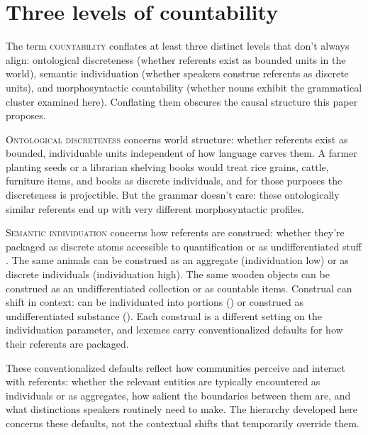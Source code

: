 \documentclass[12pt,a4paper]{article}
\begin{document}
\section{Three levels of countability}\label{sec:levels}

The term \textsc{countability} conflates at least three distinct levels that don't always align: ontological discreteness (whether referents exist as bounded units in the world), semantic individuation (whether speakers construe referents as discrete units), and morphosyntactic countability (whether nouns exhibit the grammatical cluster examined here). Conflating them obscures the causal structure this paper proposes.

\textsc{Ontological discreteness} concerns world structure: whether referents exist as bounded, individuable units independent of how language carves them. A farmer planting seeds or a librarian shelving books would treat rice grains, cattle, furniture items, and books as discrete individuals, and for those purposes the discreteness is projectible. But the grammar doesn't care: these ontologically similar referents end up with very different morphosyntactic profiles.

\textsc{Semantic individuation} concerns how referents are construed: whether they're packaged as discrete atoms accessible to quantification or as undifferentiated stuff \citep{chierchia1998,rothstein2010,grimm2018}. The same animals can be construed as an aggregate (individuation low) or as discrete individuals (individuation high). The same wooden objects can be construed as an undifferentiated collection or as countable items. Construal can shift in context:  can be individuated into portions () or construed as undifferentiated substance (). Each construal is a different setting on the individuation parameter, and lexemes carry conventionalized defaults for how their referents are packaged.

These conventionalized defaults reflect how communities perceive and interact with referents: whether the relevant entities are typically encountered as individuals or as aggregates, how salient the boundaries between them are, and what distinctions speakers routinely need to make. The hierarchy developed here concerns these defaults, not the contextual shifts that temporarily override them.
\end{document}
